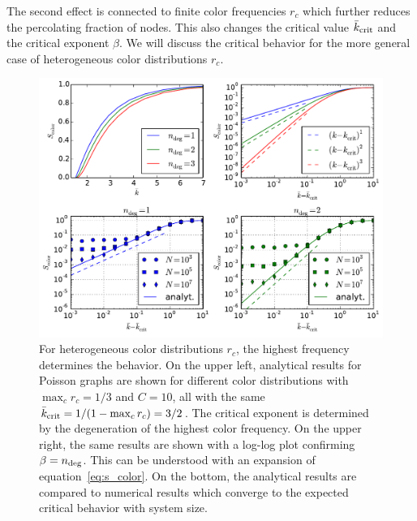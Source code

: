 \documentclass[aps, pre, onecolumn, a4paper, floatfix]{revtex4}
\begin{document}
The second effect is connected to finite color frequencies $r_c$ which further reduces the percolating 
fraction of nodes. This also changes the critical value ${\bar k}_{\rm crit}$ and the critical exponent 
$\beta$. We will discuss the critical behavior for the more general case of heterogeneous color 
distributions $r_c$. 




\begin{figure}[htb]
\begin{center}
    \includegraphics[width=0.7\columnwidth]{S_color_heterogen.pdf}
    \caption{For heterogeneous color distributions $r_c$, the highest frequency determines the behavior. 
    On the upper left, analytical results for Poisson graphs are shown for different color distributions 
    with $\max_c r_c=1/3$ and $C=10$, all with the same 
    ${\bar k}_{\rm crit}=1/(1-\max_c r_c)=3/2$. The critical exponent is determined by the degeneration 
    of the highest color frequency. On the upper right, the same results are shown with a log-log plot
    confirming $\beta=n_{\rm deg}$. This can be understood with an expansion of equation~\ref{eq:s_color}. 
    On the bottom, the analytical results are compared to numerical results which converge to the 
    expected critical behavior with system size.}
    \label{fig:pt}
\end{center}
\end{figure}
\end{document}
